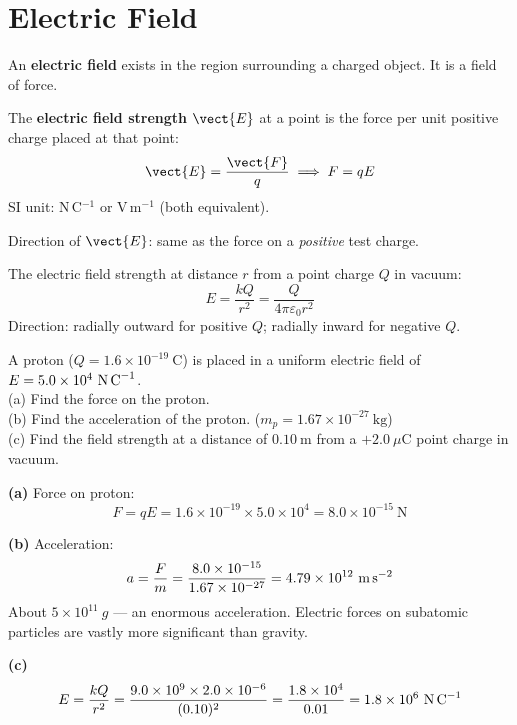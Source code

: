 \section{Electric Field}

\begin{definitionbox}
An \textbf{electric field} exists in the region
surrounding a charged object. It is a field of force.

The \textbf{electric field strength} $\vect{E}$ at a
point is the force per unit positive charge placed
at that point:
\[
  \vect{E} = \frac{\vect{F}}{q}
  \implies F = qE
\]
SI unit: N\,C$^{-1}$ or V\,m$^{-1}$ (both equivalent).

Direction of $\vect{E}$: same as the force on a
\textit{positive} test charge.
\end{definitionbox}

\begin{lawbox}
The electric field strength at distance $r$ from a
point charge $Q$ in vacuum:
\[
  E = \frac{kQ}{r^2} = \frac{Q}{4\pi\varepsilon_0 r^2}
\]
Direction: radially outward for positive $Q$;
radially inward for negative $Q$.
\end{lawbox}

\begin{examplebox}[21.2]
A proton ($Q = 1.6\times10^{-19}\ \text{C}$) is
placed in a uniform electric field of
$E = 5.0\times10^4\ \text{N\,C}^{-1}$.\\
(a) Find the force on the proton.\\
(b) Find the acceleration of the proton.
($m_p = 1.67\times10^{-27}\ \text{kg}$)\\
(c) Find the field strength at a distance of
$0.10\ \text{m}$ from a $+2.0\ \mu\text{C}$
point charge in vacuum.
\end{examplebox}

\begin{solutionbox}
\textbf{(a)} Force on proton:
\[
  F = qE = 1.6\times10^{-19}
  \times 5.0\times10^4
  = 8.0\times10^{-15}\ \text{N}
\]

\textbf{(b)} Acceleration:
\[
  a = \frac{F}{m} = \frac{8.0\times10^{-15}}
  {1.67\times10^{-27}}
  = 4.79\times10^{12}\ \text{m\,s}^{-2}
\]
About $5\times10^{11}\ g$ --- an enormous acceleration.
Electric forces on subatomic particles are vastly
more significant than gravity.

\textbf{(c)}
\[
  E = \frac{kQ}{r^2}
  = \frac{9.0\times10^9 \times 2.0\times10^{-6}}
    {(0.10)^2}
  = \frac{1.8\times10^4}{0.01}
  = 1.8\times10^6\ \text{N\,C}^{-1}
\]
\end{solutionbox}

